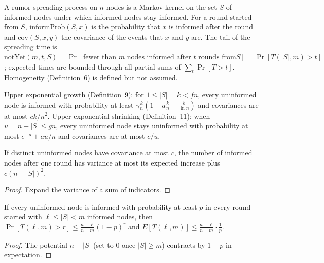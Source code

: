 \begin{definition}\label{def:rumor-process}
\leanok
A rumor-spreading process on $n$ nodes is a Markov kernel on the set $S$ of informed nodes under
which informed nodes stay informed. For a round started from $S$, $\mathrm{informProb}(S,x)$ is
the probability that $x$ is informed after the round and $\mathrm{cov}(S,x,y)$ the covariance of
the events that $x$ and $y$ are. The tail of the spreading time is
$\mathrm{notYet}(m,t,S)=\Pr[\text{fewer than }m\text{ nodes informed after }t\text{ rounds from
}S]=\Pr[T(|S|,m)>t]$; expected times are bounded through all partial sums of
$\sum_t\Pr[T>t]$. Homogeneity (Definition~6) is defined but not assumed.
\end{definition}

\begin{definition}\label{def:rumor-conditions}
\leanok{}
Upper exponential growth (Definition~9): for $1\le|S|=k<fn$, every uninformed node is informed
with probability at least $\gamma\frac kn(1-a\frac kn-\frac b{\ln n})$ and covariances are at
most $ck/n^2$. Upper exponential shrinking (Definition~11): when $u=n-|S|\le gn$, every
uninformed node stays uninformed with probability at most $e^{-\rho}+au/n$ and covariances are
at most $c/u$.
\end{definition}

\begin{lemma}[Lemma 9]\label{lem:rumor-variance}
\leanok{}
If distinct uninformed nodes have covariance at most $c$, the number of informed nodes after one
round has variance at most its expected increase plus $c(n-|S|)^2$.
\end{lemma}
\begin{proof}\leanok
Expand the variance of a sum of indicators.
\end{proof}

\begin{lemma}[Lemma 19]\label{lem:rumor-connect}
\leanok{}
If every uninformed node is informed with probability at least $p$ in every round started with
$\ell\le|S|<m$ informed nodes, then $\Pr[T(\ell,m)>r]\le\frac{n-\ell}{n-m}(1-p)^r$ and
$E[T(\ell,m)]\le\frac{n-\ell}{n-m}\cdot\frac1p$.
\end{lemma}
\begin{proof}\leanok
The potential $n-|S|$ (set to $0$ once $|S|\ge m$) contracts by $1-p$ in expectation.
\end{proof}

